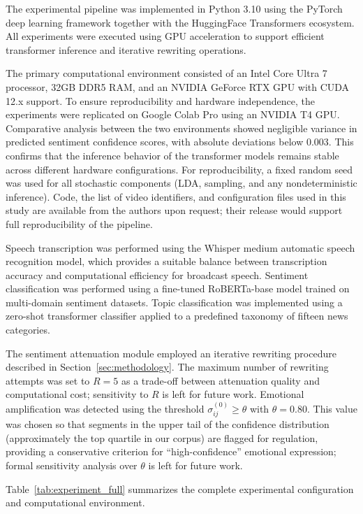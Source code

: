 \documentclass[final,1p,times]{elsarticle}
\begin{document}
The experimental pipeline was implemented in Python 3.10 using the PyTorch deep learning framework together with the HuggingFace Transformers ecosystem. All experiments were executed using GPU acceleration to support efficient transformer inference and iterative rewriting operations.

The primary computational environment consisted of an Intel Core Ultra 7 processor, 32GB DDR5 RAM, and an NVIDIA GeForce RTX GPU with CUDA 12.x support. To ensure reproducibility and hardware independence, the experiments were replicated on Google Colab Pro using an NVIDIA T4 GPU. Comparative analysis between the two environments showed negligible variance in predicted sentiment confidence scores, with absolute deviations below 0.003. This confirms that the inference behavior of the transformer models remains stable across different hardware configurations. For reproducibility, a fixed random seed was used for all stochastic components (LDA, sampling, and any nondeterministic inference). Code, the list of video identifiers, and configuration files used in this study are available from the authors upon request; their release would support full reproducibility of the pipeline.

Speech transcription was performed using the Whisper medium automatic speech recognition model, which provides a suitable balance between transcription accuracy and computational efficiency for broadcast speech. Sentiment classification was performed using a fine-tuned RoBERTa-base model trained on multi-domain sentiment datasets. Topic classification was implemented using a zero-shot transformer classifier applied to a predefined taxonomy of fifteen news categories.

The sentiment attenuation module employed an iterative rewriting procedure described in Section~\ref{sec:methodology}. The maximum number of rewriting attempts was set to $R = 5$ as a trade-off between attenuation quality and computational cost; sensitivity to $R$ is left for future work. Emotional amplification was detected using the threshold $\sigma^{(0)}_{ij} \geq \theta$ with $\theta = 0.80$. This value was chosen so that segments in the upper tail of the confidence distribution (approximately the top quartile in our corpus) are flagged for regulation, providing a conservative criterion for ``high-confidence'' emotional expression; formal sensitivity analysis over $\theta$ is left for future work.

Table~\ref{tab:experiment_full} summarizes the complete experimental configuration and computational environment.
\end{document}
